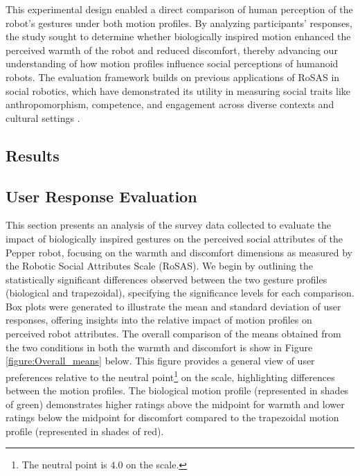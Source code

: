 \documentclass{CSSRforAfrica}
\begin{document}
This experimental design enabled a direct comparison of human perception of the robot’s gestures under both motion profiles. By analyzing participants’ responses, the study sought to determine whether biologically inspired motion enhanced the perceived warmth of the robot and reduced discomfort, thereby advancing our understanding of how motion profiles influence social perceptions of humanoid robots. The evaluation framework builds on previous applications of RoSAS in social robotics, which have demonstrated its utility in measuring social traits like anthropomorphism, competence, and engagement across diverse contexts and cultural settings \cite{Scassellatietal2012,Oliveiraetal2021}.


\subsection{Results}

\subsection{User Response Evaluation}
This section presents an analysis of the survey data collected to evaluate the impact of biologically inspired gestures on the perceived social attributes of the Pepper robot, focusing on the warmth and discomfort dimensions as measured by the Robotic Social Attributes Scale (RoSAS). 
We begin by outlining the statistically significant differences observed between the two gesture profiles (biological and trapezoidal), specifying the significance levels for each comparison. 
Box plots were generated to illustrate the mean and standard deviation of user responses, offering insights into the relative impact of motion profiles on perceived robot attributes. The overall comparison of the means obtained from the two conditions in both the warmth and discomfort is show in Figure \ref{figure:Overall_means} below. This figure provides a general view of user preferences relative to the neutral point\footnote{The neutral point is $4.0$ on the scale.} on the scale, highlighting differences between the motion profiles.  The biological motion profile (represented in shades of green) demonstrates higher ratings above the midpoint for warmth and lower ratings below the midpoint for discomfort compared to the trapezoidal motion profile (represented in shades of red).
\end{document}
